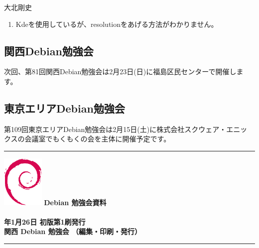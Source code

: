 \documentclass[mingoth,a4paper]{jsarticle}
\newcommand{\debmtgyear}{2014}
\newcommand{\debmtgdate}{26}
\newcommand{\debmtgmonth}{1}
\begin{document}
\begin{prework}{ 大北剛史 }
  \begin{enumerate}
  \item Kdeを使用しているが、resolutionをあげる方法がわかりません。
  \end{enumerate}
\end{prework}



\subsection{関西Debian勉強会}

次回、第81回関西Debian勉強会は2月23日(日)に福島区民センターで開催します。

\subsection{東京エリアDebian勉強会}
第109回東京エリアDebian勉強会は2月15日(土)に株式会社スクウェア・エニッ
クスの会議室でもくもくの会を主体に開催予定です。

%

\printindex

 \begin{minipage}[b]{0.2\hsize}
 \end{minipage}
 \begin{minipage}[b]{0.8\hsize}

 \vspace*{15cm}
 \rule{\hsize}{1mm}
 \vspace{2mm}
 \includegraphics[width=2cm]{image200502/openlogo-nd.eps}
 \noindent \Large \bfseries{Debian 勉強会資料}\\ \\
 \noindent \normalfont \debmtgyear{}年\debmtgmonth{}月\debmtgdate{}日 \hspace{5mm}  初版第1刷発行\\
 \noindent \normalfont 関西 Debian 勉強会 （編集・印刷・発行）\\
 \rule{\hsize}{1mm}
 \end{minipage}
\end{document}
